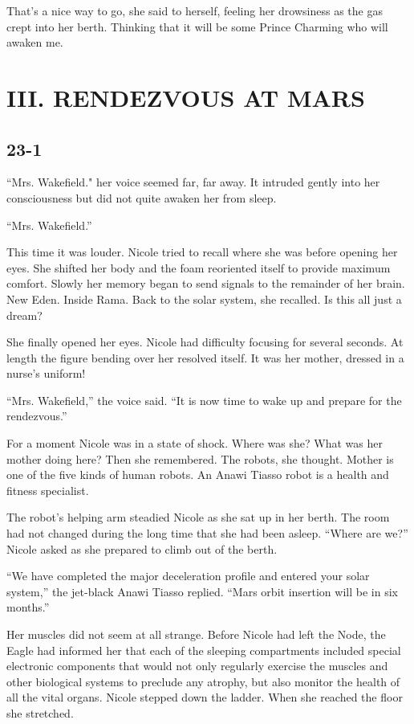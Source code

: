 \documentclass[]{article}
\begin{document}
{That’s a nice way to go, she said to herself, feeling her drowsiness as the gas crept into her berth.  Thinking that it will be some Prince Charming who will awaken me.


\newpage

\section{III.  RENDEZVOUS AT MARS}

\subsection*{23-1}

“Mrs.  Wakefield."  her voice seemed far, far away.  It intruded gently into her consciousness but did not quite awaken her from sleep.

“Mrs.  Wakefield.”

This time it was louder.  Nicole tried to recall where she was before opening her eyes.  She shifted her body and the foam reoriented itself to provide maximum comfort.  Slowly her memory began to send signals to the remainder of her brain.  New Eden.  Inside Rama.  Back to the solar system, she recalled.  Is this all just a dream?

She finally opened her eyes.  Nicole had difficulty focusing for several seconds.  At length the figure bending over her resolved itself.  It was her mother, dressed in a nurse’s uniform!

“Mrs.  Wakefield,” the voice said.  “It is now time to wake up and prepare for the rendezvous.”

For a moment Nicole was in a state of shock.  Where was she? What was her mother doing here? Then she remembered.  The robots, she thought.  Mother is one of the five kinds of human robots.  An Anawi Tiasso robot is a health and fitness specialist.

The robot’s helping arm steadied Nicole as she sat up in her berth.  The room had not changed during the long time that she had been asleep.  “Where are we?” Nicole asked as she prepared to climb out of the berth.

“We have completed the major deceleration profile and entered your solar system,” the jet-black Anawi Tiasso replied.  “Mars orbit insertion will be in six months.”

Her muscles did not seem at all strange.  Before Nicole had left the Node, the Eagle had informed her that each of the sleeping compartments included special electronic components that would not only regularly exercise the muscles and other biological systems to preclude any atrophy, but also monitor the health of all the vital organs.  Nicole stepped down the ladder.  When she reached the floor she stretched.

}
\end{document}
